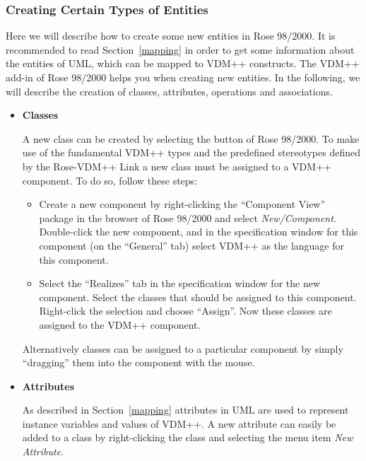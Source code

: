 \documentclass[\pformat,12pt]{article}
\newcommand{\vdmpp}{VDM++}
\newcommand{\link}{Rose-\vdmpp{} Link}
\newcommand{\rose}{Rose 98/2000}
\begin{document}
\subsubsection*{Creating Certain Types of Entities}
  
Here we will describe how to create some new entities in \rose{}.  It
is recommended to read Section~\ref{mapping} in order to get some
information about the entities of UML, which can be mapped to \vdmpp{}
constructs. The \vdmpp{} add-in of \rose{} helps you when creating new
entities. In the following, we will describe the creation of classes,
attributes, operations and associations.

\begin{itemize}
\item{\bf Classes} 

A new class can be created by selecting the
   button of
  \rose{}. To make use of the fundamental \vdmpp{} types and the
  predefined stereotypes defined by the \link{} a new class must be
  assigned to a \vdmpp{} component. To do so, follow these steps:
  \begin{itemize}
  \item Create a new component by right-clicking the ``Component
    View'' package in the browser of \rose{} and select {\em
      New/Component}. Double-click the new component, and in the
    specification window for this component (on the ``General'' tab)
    select \vdmpp{} as the language for this component.
  \item Select the ``Realizes'' tab in the specification window for
    the new component. Select the classes that should be assigned to
    this component. Right-click the selection and choose ``Assign''.
    Now these classes are assigned to the \vdmpp{} component.
  \end{itemize}
  Alternatively classes can be assigned to a particular component by
  simply ``dragging'' them into the component with the mouse.

\item{\bf Attributes}

  As described in Section~\ref{mapping} attributes in UML are used to
  represent instance variables and values
of \vdmpp{}.
  A new attribute can easily be added to a class by right-clicking the
  class and selecting the menu item {\it New Attribute}.
  

\end{itemize}
\end{document}
